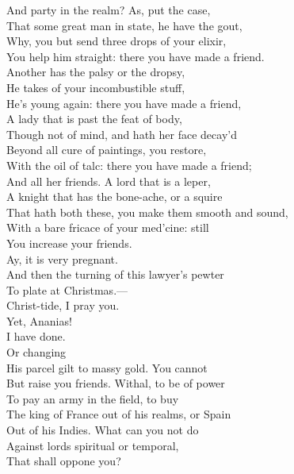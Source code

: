 \documentclass[a4paper,oneside]{memoir}
\begin{document}
\begin{drama*}
And party in the realm? As, put the case,\\
That some great man in state, he have the gout,\\
Why, you but send three drops of your elixir,\\
You help him straight: there you have made a friend.\\
Another has the palsy or the dropsy,\\
He takes of your incombustible stuff,\\
He's young again: there you have made a friend,\\
A lady that is past the feat of body,\\
Though not of mind, and hath her face decay'd\\
Beyond all cure of paintings, you restore,\\
With the oil of talc: there you have made a friend;\\
And all her friends. A lord that is a leper,\\
A knight that has the bone-ache, or a squire\\
That hath both these, you make them smooth and sound,\\
With a bare fricace of your med'cine: still\\
You increase your friends.\\
\tribulationspeaks {} Ay, it is very pregnant.\\
\subtlespeaks And then the turning of this lawyer's pewter\\
To plate at Christmas.---\\
\ananiasspeaks {} Christ-tide, I pray you.\\
\subtlespeaks Yet, Ananias!\\
\ananiasspeaks {} I have done.\\
\subtlespeaks {} Or changing\\
His parcel gilt to massy gold. You cannot\\
But raise you friends. Withal, to be of power\\
To pay an army in the field, to buy\\
The king of France out of his realms, or Spain\\
Out of his Indies. What can you not do\\
Against lords spiritual or temporal,\\
That shall oppone you?\\

\end{drama*}
\end{document}
